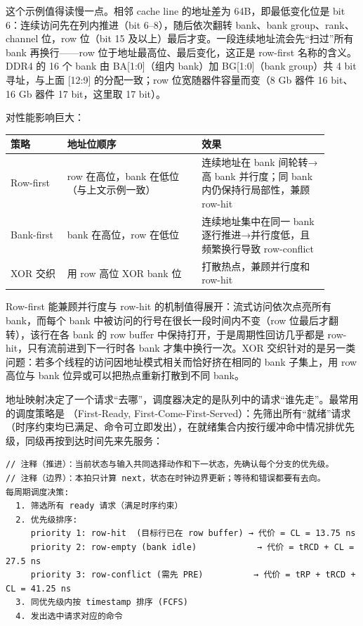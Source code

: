 这个示例值得读慢一点。相邻 cache line 的地址差为 64B，即最低变化位是 bit 6：连续访问先在列内推进（bit 6--8），随后依次翻转 bank、bank group、rank、channel 位，row 位（bit 15 及以上）最后才变。一段连续地址流会先“扫过”所有 bank 再换行——row 位于地址最高位、最后变化，这正是 row-first 名称的含义。DDR4 的 16 个 bank 由 BA[1:0]（组内 bank）加 BG[1:0]（bank group）共 4 bit 寻址，与上面 [12:9] 的分配一致；row 位宽随器件容量而变（8 Gb 器件 16 bit、16 Gb 器件 17 bit，这里取 17 bit）。

对性能影响巨大：

\begin{longtable}{L{0.16\linewidth}L{0.38\linewidth}L{0.36\linewidth}}
\toprule
策略 & 地址位顺序 & 效果 \\
\midrule
Row-first & row 在高位，bank 在低位（与上文示例一致） & 连续地址在 bank 间轮转→高 bank 并行度；同 bank 内仍保持行局部性，兼顾 row-hit \\\tablerowrule
Bank-first & bank 在高位，row 在低位 & 连续地址集中在同一 bank 逐行推进→并行度低，且频繁换行导致 row-conflict \\\tablerowrule
XOR 交织 & 用 row 高位 XOR bank 位 & 打散热点，兼顾并行度和 row-hit \\
\bottomrule
\end{longtable}

Row-first 能兼顾并行度与 row-hit 的机制值得展开：流式访问依次点亮所有 bank，而每个 bank 中被访问的行号在很长一段时间内不变（row 位最后才翻转），该行在各 bank 的 row buffer 中保持打开，于是周期性回访几乎都是 row-hit，只有流前进到下一行时各 bank 才集中换行一次。XOR 交织针对的是另一类问题：若多个线程的访问因地址模式相关而恰好挤在相同的 bank 子集上，用 row 高位与 bank 位异或可以把热点重新打散到不同 bank。



地址映射决定了一个请求“去哪”，调度器决定的是队列中的请求“谁先走”。最常用的调度策略是 （First-Ready, First-Come-First-Served）：先筛出所有“就绪”请求（时序约束均已满足、命令可立即发出），在就绪集合内按行缓冲命中情况排优先级，同级再按到达时间先来先服务：

\begin{lstlisting}
// 注释（推进）：当前状态与输入共同选择动作和下一状态，先确认每个分支的优先级。
// 注释（边界）：本拍只计算 next，状态在时钟边界更新；等待和错误都要有去向。
每周期调度决策:
  1. 筛选所有 ready 请求（满足时序约束）
  2. 优先级排序:
     priority 1: row-hit  (目标行已在 row buffer) → 代价 = CL = 13.75 ns
     priority 2: row-empty (bank idle)            → 代价 = tRCD + CL = 27.5 ns
     priority 3: row-conflict (需先 PRE)          → 代价 = tRP + tRCD + CL = 41.25 ns
  3. 同优先级内按 timestamp 排序 (FCFS)
  4. 发出选中请求对应的命令
\end{lstlisting}

